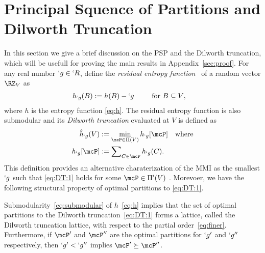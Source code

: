 \section{Principal Squence of Partitions and Dilworth Truncation}
\label{sec:dt}

\label{sec:PSP}
%
In this section we give a brief discussion on the PSP and the  Dilworth truncation,
which will be usefull for proving the main results in Appendix~\ref{sec:proof}.
For any real number $`g\in `R$, define the \emph{residual entropy function}~\cite{chan15mi} of a random vector $\RZ_V$ as
\begin{align}
	h_{`g}(B)&:= h(B)-`g \kern2.5em \text{for $B\subseteq V$}, \label{eq:residualH}
\end{align}
where $h$ is the entropy function \eqref{eq:h}.
The residual entropy function is also submodular and its \emph{Dilworth truncation} evaluated at $V$ is defined as~\cite{schrijver02}
\begin{subequations}
	\label{eq:DT}
\begin{align}
		\hat{h}_{`g}(V)&:= \min_{\mcP\in \Pi(V)} h_{`g}[\mcP] \kern1em\text{where}\label{eq:DT:1}\\
		h_{`g}[\mcP] &:= \sum\nolimits_{C\in \mcP} h_{`g}(C). \label{eq:DT:2} 
\end{align} 
\end{subequations}
This definition provides an alternative charaterization of the MMI as the smallest $`g$ such that
\eqref{eq:DT:1} holds for some $\mcP \in \Pi'(V)$ \cite{chan15mi}. Morevoer, we have the
following structural property of optimal partitions to \eqref{eq:DT:1}.
\begin{Proposition}
	\label{prop:plp}
	Submodularity~\eqref{eq:submodular} of $h$~\eqref{eq:h} implies that the set of optimal
	partitions to the Dilworth truncation~\eqref{eq:DT:1} forms a lattice, called the Dilworth
	truncation lattice, with respect to the partial order~\eqref{eq:finer}. Furthermore, if $\mcP'$
	and $\mcP''$ are the optimal partitions for $`g'$ and $`g''$ respectively, then $`g'<`g''$
	implies $\mcP'\succeq \mcP''$.
\end{Proposition}
